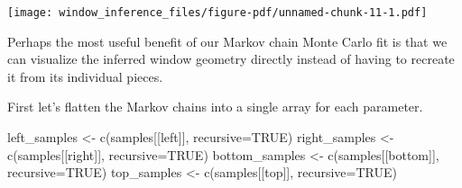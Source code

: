 \documentclass[
  letterpaper,
  DIV=11,
  numbers=noendperiod]{scrartcl}
\newenvironment{Shaded}{\begin{snugshade}}{\end{snugshade}}
\newcommand{\AttributeTok}[1]{\textcolor[rgb]{0.40,0.45,0.13}{#1}}
\newcommand{\ConstantTok}[1]{\textcolor[rgb]{0.56,0.35,0.01}{#1}}
\newcommand{\DecValTok}[1]{\textcolor[rgb]{0.68,0.00,0.00}{#1}}
\newcommand{\FloatTok}[1]{\textcolor[rgb]{0.68,0.00,0.00}{#1}}
\newcommand{\FunctionTok}[1]{\textcolor[rgb]{0.28,0.35,0.67}{#1}}
\newcommand{\NormalTok}[1]{\textcolor[rgb]{0.00,0.23,0.31}{#1}}
\newcommand{\OtherTok}[1]{\textcolor[rgb]{0.00,0.23,0.31}{#1}}
\newcommand{\SpecialCharTok}[1]{\textcolor[rgb]{0.37,0.37,0.37}{#1}}
\newcommand{\StringTok}[1]{\textcolor[rgb]{0.13,0.47,0.30}{#1}}
\begin{document}
\begin{Shaded}
\end{Shaded}

\texttt{[image: window\_inference\_files/figure-pdf/unnamed-chunk-11-1.pdf]}

Perhaps the most useful benefit of our Markov chain Monte Carlo fit is
that we can visualize the inferred window geometry directly instead of
having to recreate it from its individual pieces.

First let's flatten the Markov chains into a single array for each
parameter.

\begin{Shaded}
\begin{Highlighting}[]
\NormalTok{left\_samples }\OtherTok{\textless{}{-}} \FunctionTok{c}\NormalTok{(samples[[}\StringTok{\textquotesingle{}left\textquotesingle{}}\NormalTok{]], }\AttributeTok{recursive=}\ConstantTok{TRUE}\NormalTok{)}
\NormalTok{right\_samples }\OtherTok{\textless{}{-}} \FunctionTok{c}\NormalTok{(samples[[}\StringTok{\textquotesingle{}right\textquotesingle{}}\NormalTok{]], }\AttributeTok{recursive=}\ConstantTok{TRUE}\NormalTok{)}
\NormalTok{bottom\_samples }\OtherTok{\textless{}{-}} \FunctionTok{c}\NormalTok{(samples[[}\StringTok{\textquotesingle{}bottom\textquotesingle{}}\NormalTok{]], }\AttributeTok{recursive=}\ConstantTok{TRUE}\NormalTok{)}
\NormalTok{top\_samples }\OtherTok{\textless{}{-}} \FunctionTok{c}\NormalTok{(samples[[}\StringTok{\textquotesingle{}top\textquotesingle{}}\NormalTok{]], }\AttributeTok{recursive=}\ConstantTok{TRUE}\NormalTok{)}
\end{Highlighting}
\end{Shaded}
\end{document}
